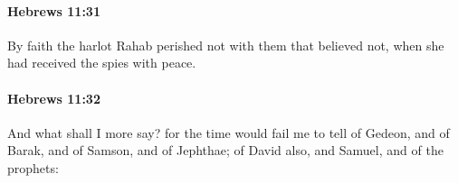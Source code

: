 		\paragraph{Hebrews 11:31} %
			\label{HEBREWS-11-31}

			By faith the harlot Rahab perished not with them that believed not, when she had received the spies with peace.

			\begin{framed}
			\scriptsize
				\begin{compactdesc}
					\item[SBLG] 
				\end{compactdesc}
			\end{framed}

		\paragraph{Hebrews 11:32} %
			\label{HEBREWS-11-32}

			And what shall I more say? for the time would fail me to tell of Gedeon, and of Barak, and of Samson, and of Jephthae; of David also, and Samuel, and of the prophets:

